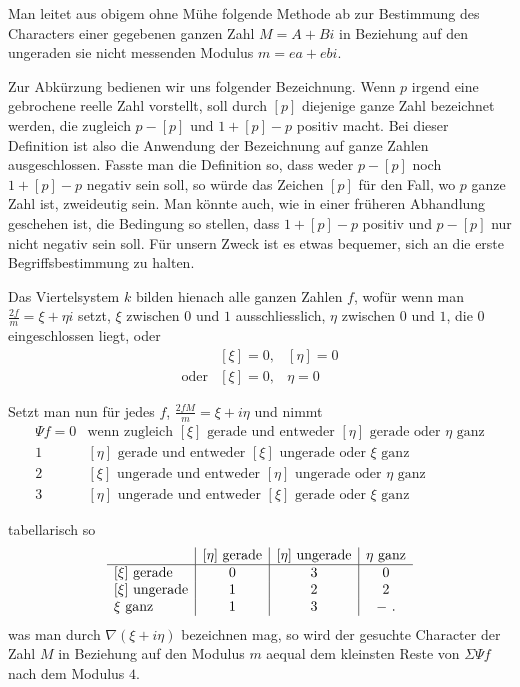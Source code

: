 %
Man leitet aus obigem ohne Mühe folgende Methode ab zur Bestimmung des Characters einer gegebenen ganzen Zahl $M=A+Bi$ in Beziehung auf den ungeraden sie nicht messenden Modulus $m=ea+ebi$.

Zur Abkürzung bedienen wir uns folgender Bezeichnung. Wenn $p$ irgend eine gebrochene reelle Zahl vorstellt, soll durch $[p]$ diejenige ganze Zahl bezeichnet werden, die zugleich $p-[p]$ und $1+[p]-p$ positiv macht. Bei dieser Definition ist also die Anwendung der Bezeichnung auf ganze Zahlen ausgeschlossen. Fasste man die Definition so, dass weder $p-[p]$ noch $1+[p]-p$ negativ sein soll, so würde das Zeichen $[p]$ für den Fall, wo $p$ ganze Zahl ist, zweideutig sein. Man könnte auch, wie in einer früheren Abhandlung geschehen ist, die Bedingung so stellen, dass $1+[p]-p$ positiv und $p-[p]$ nur nicht negativ sein soll. Für unsern Zweck ist es etwas bequemer, sich an die erste Begriffsbestimmung zu halten.

Das Viertelsystem $k$ bilden hienach alle ganzen Zahlen $f$, wofür wenn man $\frac{2f}{m}=\xi+\eta i$ setzt, $\xi$ zwischen $0$ und $1$ ausschliesslich, $\eta$ zwischen $0$ und $1$, die $0$ eingeschlossen liegt, oder
\[
\begin{array}{lll}
&[\xi]=0,&[\eta]=0\\
\text{oder}&[\xi]=0,&\eta=0
\end{array}
\]

Setzt man nun für jedes $f$, $\frac{2fM}{m}=\xi+i\eta$ und nimmt
\begingroup\small\setlength{\arraycolsep}{2pt}
\[
\begin{array}{rl}
\Psi f=0&\text{wenn zugleich }[\xi]\text{ gerade und entweder }[\eta]\text{ gerade oder }\eta\text{ ganz}\\
1&[\eta]\text{ gerade und entweder }[\xi]\text{ ungerade oder }\xi\text{ ganz}\\
2&[\xi]\text{ ungerade und entweder }[\eta]\text{ ungerade oder }\eta\text{ ganz}\\
3&[\eta]\text{ ungerade und entweder }[\xi]\text{ gerade oder }\xi\text{ ganz}
\end{array}
\]
\endgroup

tabellarisch so
\[
\begin{array}{l|c|c|c}
&[\eta]\text{ gerade}&[\eta]\text{ ungerade}&\eta\text{ ganz}\\\hline
[\xi]\text{ gerade}&0&3&0\\
\relax[\xi]\text{ ungerade}&1&2&2\\
\xi\text{ ganz}&1&3&-\ \mathbin{.}
\end{array}
\]
was man durch $\nabla(\xi+i\eta)$ bezeichnen mag, so wird der gesuchte Character der Zahl $M$ in Beziehung auf den Modulus $m$ aequal dem kleinsten Reste von $\Sigma\Psi f$ nach dem Modulus $4$.

